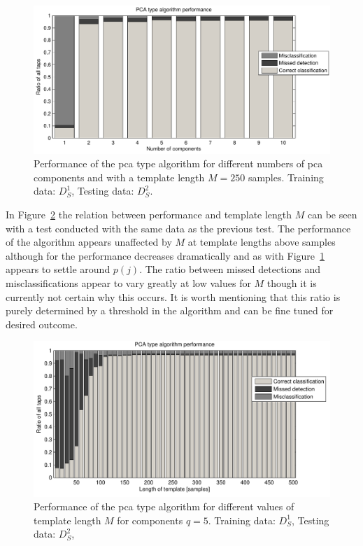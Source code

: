 \begin{figure}[!] %
\centering
\includegraphics[width=150mm]{PCAperform.pdf}
\caption{Performance of the \DIFdelbeginFL {}\DIFdelendFL \DIFaddbeginFL \gls{pca} \DIFaddendFL type algorithm for different numbers of \DIFdelbeginFL {}\DIFdelendFL \DIFaddbeginFL \gls{pca} \DIFaddendFL components and with a template length $M=250$ samples. Training data: $D^1_S$, Testing data: $D^2_S$.}\label{fig:PCAperform}
\end{figure}

In Figure~\ref{fig:PCAperformLength} the relation between performance and template length $M$ can be seen with a test conducted with the same data as the previous test. The performance of the algorithm appears unaffected by $M$ at template lengths above \DIFdelbegin {}\DIFdelend \DIFaddbegin {}\DIFaddend samples although for \DIFdelbegin {}\DIFdelend \DIFaddbegin {}\DIFaddend the performance decreases dramatically and as with Figure~\ref{fig:PCAperform} appears to settle around $p(j)$. The ratio between missed detections and misclassifications appear to vary greatly at low values for $M$ though it is currently not certain why this occurs. It is worth mentioning that this ratio is purely determined by a threshold in the algorithm and can be fine tuned for \DIFaddbegin {}\DIFaddend desired outcome.

\begin{figure}[!] %
\centering
\includegraphics[width=150mm]{PCAperformLength.pdf}
\caption{Performance of the \DIFdelbeginFL {}\DIFdelendFL \DIFaddbeginFL \gls{pca} \DIFaddendFL type algorithm for different values of template length $M$ for components $q=5$. Training data: $D^1_S$, Testing data: $D^2_S$,}\label{fig:PCAperformLength}
\end{figure}

